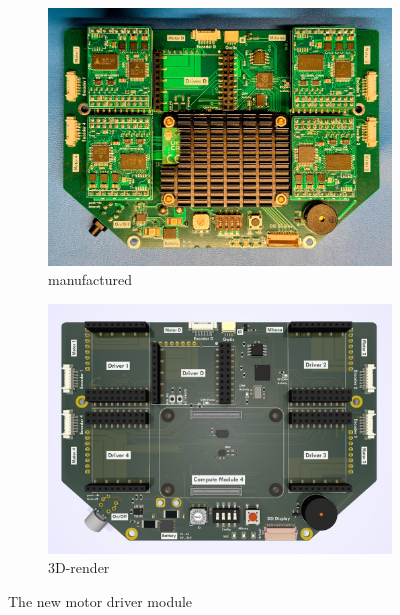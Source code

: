\documentclass[runningheads]{llncs}
\begin{document}
\begin{figure}
    \centering
    \begin{subfigure}[b]{0.45\textwidth}
         \centering
         \includegraphics[width=\textwidth]{images/main-board.jpg}
         \caption{manufactured}
    \end{subfigure}
    \hfill
    \begin{subfigure}[b]{0.5\textwidth}
        \centering
        \includegraphics[width=\textwidth]{images/main-board-render.jpg}
        \caption{3D-render}
    \end{subfigure}
    \caption{The new motor driver module}
    \label{fig:main-board}
\end{figure}
\end{document}
